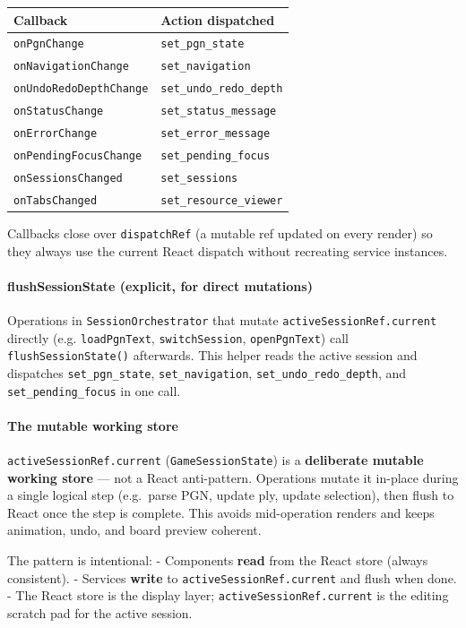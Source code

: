 \documentclass[]{article}
\let\oldparagraph\paragraph
\renewcommand{\paragraph}[1]{\oldparagraph{#1}\mbox{}}
\begin{document}
\begin{longtable}[]{@{}ll@{}}
\toprule
Callback & Action dispatched\tabularnewline
\midrule
\endhead
\texttt{onPgnChange} & \texttt{set\_pgn\_state}\tabularnewline
\texttt{onNavigationChange} & \texttt{set\_navigation}\tabularnewline
\texttt{onUndoRedoDepthChange} &
\texttt{set\_undo\_redo\_depth}\tabularnewline
\texttt{onStatusChange} & \texttt{set\_status\_message}\tabularnewline
\texttt{onErrorChange} & \texttt{set\_error\_message}\tabularnewline
\texttt{onPendingFocusChange} &
\texttt{set\_pending\_focus}\tabularnewline
\texttt{onSessionsChanged} & \texttt{set\_sessions}\tabularnewline
\texttt{onTabsChanged} & \texttt{set\_resource\_viewer}\tabularnewline
\bottomrule
\end{longtable}

Callbacks close over \texttt{dispatchRef} (a mutable ref updated on
every render) so they always use the current React dispatch without
recreating service instances.

\paragraph{flushSessionState (explicit, for direct
mutations)}\label{flushsessionstate-explicit-for-direct-mutations}

Operations in \texttt{SessionOrchestrator} that mutate
\texttt{activeSessionRef.current} directly (e.g. \texttt{loadPgnText},
\texttt{switchSession}, \texttt{openPgnText}) call
\texttt{flushSessionState()} afterwards. This helper reads the active
session and dispatches \texttt{set\_pgn\_state},
\texttt{set\_navigation}, \texttt{set\_undo\_redo\_depth}, and
\texttt{set\_pending\_focus} in one call.

\paragraph{The mutable working store}\label{the-mutable-working-store}

\texttt{activeSessionRef.current} (\texttt{GameSessionState}) is a
\textbf{deliberate mutable working store} --- not a React anti-pattern.
Operations mutate it in-place during a single logical step (e.g.~parse
PGN, update ply, update selection), then flush to React once the step is
complete. This avoids mid-operation renders and keeps animation, undo,
and board preview coherent.

The pattern is intentional: - Components \textbf{read} from the React
store (always consistent). - Services \textbf{write} to
\texttt{activeSessionRef.current} and flush when done. - The React store
is the display layer; \texttt{activeSessionRef.current} is the editing
scratch pad for the active session.
\end{document}
